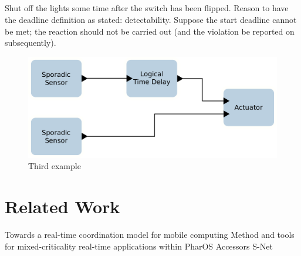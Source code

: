 \documentclass[sigconf]{acmart}
\newcommand{\marten}[1]{{\color{cyan} Marten: #1}}
\begin{document}
\subsection{}
Shut off the lights some time after the switch has been flipped. Reason to have the deadline definition as stated: detectability. Suppose the start deadline cannot be met; the reaction should not be carried out (and the violation be reported on subsequently).

\begin{figure}[ht]
 \centering
 \includegraphics[width=\linewidth]{img/example-3}
 \caption{Third example}
 \label{fig:example-3}
\end{figure}

\section{Related Work}
\label{sec:related}
Towards a real-time coordination model for mobile computing \cite{hackmann2005towards}
Method and tools for mixed-criticality real-time applications within PharOS \cite{lemerre2011method}
Accessors \cite{brooks2018component}
S-Net~\cite{grelck2008gentle}
%



\end{document}
